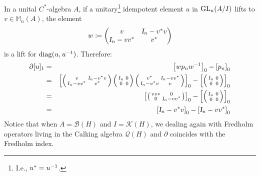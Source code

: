 \begin{exemplo}
    In a unital $C^*$-algebra $A$, if a unitary\footnote{I.e., $u^*= {u}^{-1}$.} idempotent element $u$ in $\operatorname{GL}_n(A/I)$ lifts to $v\in \mathbb M_n(A)$, the element
    \begin{equation*}
        w \coloneqq \begin{pmatrix}
            v &  \textsl{I}_n - v^*v \\ \textsl{I}_n - vv^* & v^*
        \end{pmatrix}
    \end{equation*}
    is a lift for $\operatorname{diag}(u, {u}^{-1})$. Therefore:
    \begin{eqnarray*}
        \partial [u]_1 &=& \left[wp_n \inv w\right]_0 - \left[p_n\right]_0 \\
        &=& \left[\left(\begin{smallmatrix}
            v &  \Id_n - v^*v \\ \Id_n - vv^* & v^*
        \end{smallmatrix}\right)
        \left(\begin{smallmatrix}
            \vphantom{\Id_n-v^*v}\Id_n & 0 \\ \vphantom{\Id_n-v^*v}0 & 0
        \end{smallmatrix}
        \right)\left(\begin{smallmatrix}
            v^* &  \Id_n - vv^* \\ \Id_n - v^*v & v
        \end{smallmatrix}\right)\right]_0 - \left[
            \left(\begin{smallmatrix}
                \vphantom{\Id_n-v^*v}\Id_n & 0 \\ \vphantom{\Id_n-v^*v}0 & 0
            \end{smallmatrix}\right)\right]_0 \\
            &=&  \left[\left(\begin{smallmatrix}
                vv* &  0 \\
                0 & \Id_n- vv^*
            \end{smallmatrix}\right)\right]_0 - \left[
                \left(\begin{smallmatrix}
                    \vphantom{\Id_n-v^*v}\Id_n & 0 \\ \vphantom{\Id_n-v^*v}0 & 0
                \end{smallmatrix}\right)\right]_0 \\
            &=& \left[\Id_n - v^*v\right]_0 - \left[\Id_n-vv^*\right]_0
    \end{eqnarray*}
    Notice that when $A = \mathscr B(H)$ and $I = \mathscr K(H)$, we dealing again with Fredholm operators living in the Calking algebra $\mathscr Q(H)$ and $\partial$ coincides with the Fredholm index. 
\end{exemplo}